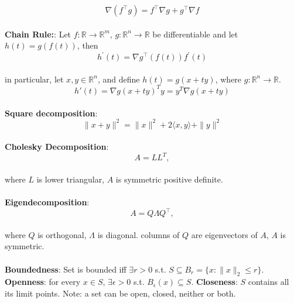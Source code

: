 \begin{theorem}[]{}
    \begin{equation*}
        \nabla (f^\top g) = f^\top \nabla g + g^\top \nabla f
    \end{equation*}
    \vspace{-4pt}\\
    \textbf{Chain Rule:}:
    Let $f: \mathbb{R} \rightarrow \mathbb{R}^m$, $g: \mathbb{R}^n \rightarrow \mathbb{R}$ be differentiable and let $h(t) = g(f(t))$, then
    \vspace{-4pt}\\
    \begin{equation*}
        h^\prime(t)=\nabla g^\top\left(f(t)\right) f^\prime(t)
    \end{equation*}
    \vspace{-4pt}\\
    in particular, let $x,y\in\mathbb{R}^n$, and define $h(t)=g(x+ty)$, where $g:\mathbb{R}^n\to\mathbb{R}$.
    \vspace{-4pt}\\
    $$
    h'(t)=\nabla g(x+ty)^T y = y^T\nabla g(x+ty)
    $$
    \vspace{-5pt}\\
    \textbf{Square decomposition}:
    \vspace{-5pt}\\
    \begin{equation*}
        \|x+y\|^2 = \|x\|^2 + 2\langle x, y \rangle + \|y\|^2
    \end{equation*}
    \vspace{-5pt}\\
    \textbf{Cholesky Decomposition}:
    \vspace{-5pt}\\
    \begin{equation*}
        A = LL^T, 
    \end{equation*}
    \vspace{-5pt}\\
    where $L$ is lower triangular, $A$ is symmetric positive definite.\\
    \vspace{-5pt}\\
    \textbf{Eigendecomposition}:
    \vspace{-5pt}\\
    \begin{equation*}
        A = Q\Lambda Q^\top,
    \end{equation*}
    \vspace{-5pt}\\
    where $Q$ is orthogonal, $\Lambda$ is diagonal. columns of $Q$ are eigenvectors of $A$, $A$ is symmetric.\\
    \vspace{-5pt}\\
    \textbf{Boundedness}:
    Set is bounded iff $\exists r > 0$ s.t. $S \subseteq B_r = \{x: \|x\|_2 \leq r\}$.
    \textbf{Openness}:
    for every $x \in S$, $\exists \epsilon > 0$ s.t. $B_\epsilon(x) \subseteq S$.
    \textbf{Closeness}:
    $S$ contains all its limit points. Note: a set can be open, closed, neither or both.
\end{theorem}